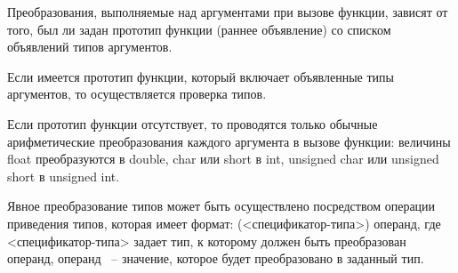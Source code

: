  \BL

Преобразования, выполняемые над аргументами при вызове функции, зависят от того, был ли задан прототип функции (раннее объявление) со списком объявлений типов аргументов. \killoverfullbefore

Если имеется прототип функции, который включает объявленные типы аргументов, то осуществляется проверка типов.\killoverfullbefore

Если прототип функции отсутствует, то проводятся только обычные арифметические преобразования каждого аргумента в вызове функции: величины float преобразуются в double, char или short в int, unsigned char или unsigned short в unsigned int. \killoverfullbefore \BL



 \BL

Явное преобразование типов может быть осуществлено посредством операции приведения типов, которая имеет формат: (<спецификатор-типа>) операнд, где <спецификатор-типа> задает тип, к которому должен быть преобразован операнд, операнд ~-- значение, которое будет преобразовано в заданный тип. \killoverfullbefore \BL 

